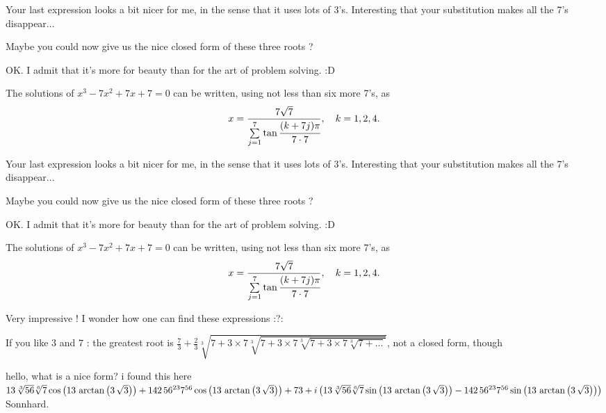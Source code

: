 \begin{solution}
	Your last expression looks a bit nicer for me, in the sense that it uses lots of 3's. Interesting that your substitution makes all the 7's disappear...

\begin{tcolorbox}Maybe you could now give us the nice closed form of these three roots ?\end{tcolorbox}OK. I admit that it's more for beauty than for the art of problem solving. :D

The solutions of $x^{3}-7x^{2}+7x+7=0$ can be written, using not less than six more 7's, as \[{x=\dfrac{7\sqrt{7}}{\sum\limits_{j=1}^7\tan \cfrac{ {(k+7j)\pi}}{   {7\cdot7}}}},\quad k=1,2,4.\]
\end{solution}



\begin{solution}
	\begin{tcolorbox}Your last expression looks a bit nicer for me, in the sense that it uses lots of 3's. Interesting that your substitution makes all the 7's disappear...

\begin{tcolorbox}Maybe you could now give us the nice closed form of these three roots ?\end{tcolorbox}OK. I admit that it's more for beauty than for the art of problem solving. :D

The solutions of $x^{3}-7x^{2}+7x+7=0$ can be written, using not less than six more 7's, as \[{x=\dfrac{7\sqrt{7}}{\sum\limits_{j=1}^7\tan \cfrac{ {(k+7j)\pi}}{   {7\cdot7}}}},\quad k=1,2,4.\]\end{tcolorbox}
Very impressive ! I wonder how one can find these expressions :?:

If you like $3$ and $7$ : the greatest root is $\boxed{\frac 73+\frac 23\sqrt[3]{7+3\times 7\sqrt[3]{7+3\times 7\sqrt[3]{7+3\times 7\sqrt[3]{7+...}}}}}$, not a closed form, though
\end{solution}



\begin{solution}
	hello, what is a nice form? i found this here
$1\/3\,\sqrt [3]{56}\sqrt [6]{7}\cos \left( 1\/3\,\arctan \left( 3\,
\sqrt {3} \right)  \right) +1\/42\,{56}^{2\/3}{7}^{5\/6}\cos \left( 1\/3\,
\arctan \left( 3\,\sqrt {3} \right)  \right) +7\/3+i \left( 1\/3\,\sqrt 
[3]{56}\sqrt [6]{7}\sin \left( 1\/3\,\arctan \left( 3\,\sqrt {3}
 \right)  \right) -1\/42\,{56}^{2\/3}{7}^{5\/6}\sin \left( 1\/3\,\arctan
 \left( 3\,\sqrt {3} \right)  \right)  \right) 
$
Sonnhard.
\end{solution}



